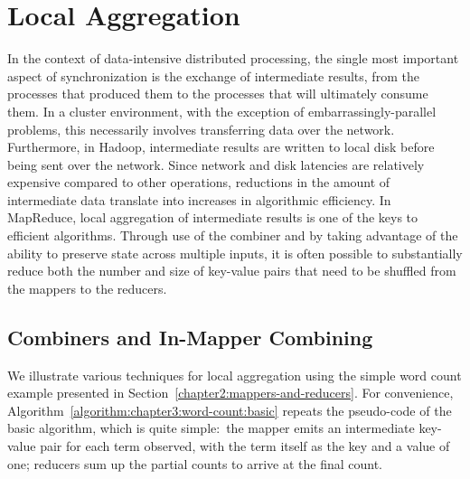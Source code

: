 \section{Local Aggregation}
\label{chapter3:local-aggregation}

In the context of data-intensive distributed processing, the single
most important aspect of synchronization is the exchange of
intermediate results, from the processes that produced them to the
processes that will ultimately consume them.  In a cluster
environment, with the exception of embarrassingly-parallel problems,
this necessarily involves transferring data over the network.
Furthermore, in Hadoop, intermediate results are written to local disk
before being sent over the network.  Since network and disk latencies
are relatively expensive compared to other operations, reductions in
the amount of intermediate data translate into increases in
algorithmic efficiency.  In MapReduce, local aggregation of
intermediate results is one of the keys to efficient algorithms.
Through use of the combiner and by taking advantage of the ability to
preserve state across multiple inputs, it is often possible to
substantially reduce both the number and size of key-value pairs that
need to be shuffled from the mappers to the reducers.

\subsection{Combiners and In-Mapper Combining}
\label{chapter3:local-aggregation:combiners}

We illustrate various techniques for local aggregation using the
simple word count example presented in
Section~\ref{chapter2:mappers-and-reducers}.  For convenience,
Algorithm~\ref{algorithm:chapter3:word-count:basic} repeats the pseudo-code
of the basic algorithm, which is quite simple:\ the mapper emits an
intermediate key-value pair for each term observed, with the term
itself as the key and a value of one; reducers sum up the partial
counts to arrive at the final count.

